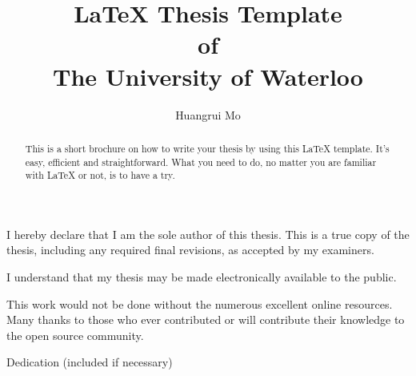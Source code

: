 \title[\LaTeX{} Thesis Template of UW]{\LaTeX{} Thesis Template\\ of\\ The University of Waterloo}%
\author{Huangrui Mo}
\maketitle
\begin{declaration}
    \noindent
    I hereby declare that I am the sole author of this thesis. This is a true copy of the thesis, including any required final revisions, as accepted by my examiners.

    \bigskip

    \noindent
    I understand that my thesis may be made electronically available to the public.
\end{declaration}
\begin{abstract}
    This is a short brochure on how to write your thesis by using this \LaTeX{} template. It's easy, efficient and straightforward. What you need to do, no matter you are familiar with \LaTeX{} or not, is to have a try. 
\end{abstract}
\begin{acknowledgements}
    This work would not be done without the numerous excellent online resources. Many thanks to those who ever contributed or will contribute their knowledge to the open source community.
\end{acknowledgements}
\begin{dedication}
    Dedication (included if necessary)
\end{dedication}

